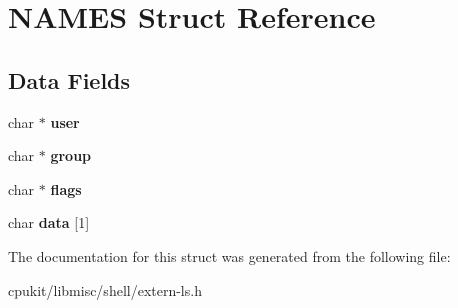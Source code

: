 \hypertarget{structNAMES}{}\section{N\+A\+M\+ES Struct Reference}
\label{structNAMES}
\subsection*{Data Fields}
\begin{DoxyCompactItemize}
\item 
\mbox{\label{structNAMES_a2a083b515435172fadb1b70704849e6f}} 
char $\ast$ {\bfseries user}
\item 
\mbox{\label{structNAMES_a359d7e1193b32d7e2b923410b86c8586}} 
char $\ast$ {\bfseries group}
\item 
\mbox{\label{structNAMES_abb361fec157f935325d6f11bd7e498b3}} 
char $\ast$ {\bfseries flags}
\item 
\mbox{\label{structNAMES_a78bbd780c0cab1dc291de79210915f2f}} 
char {\bfseries data} \mbox{[}1\mbox{]}
\end{DoxyCompactItemize}


The documentation for this struct was generated from the following file\+:\begin{DoxyCompactItemize}
\item 
cpukit/libmisc/shell/extern-\/ls.\+h\end{DoxyCompactItemize}

